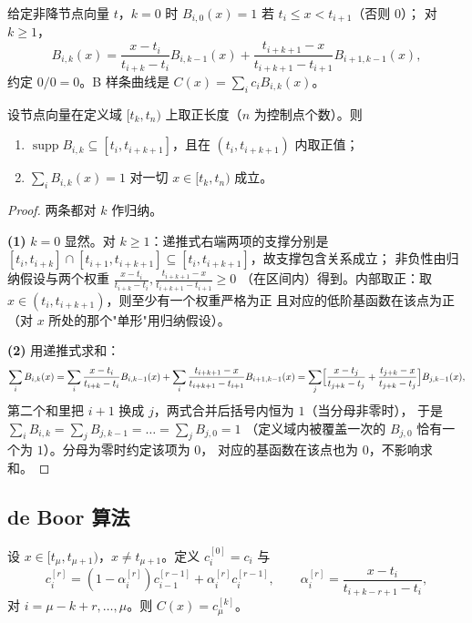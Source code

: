 \begin{definition}
给定非降节点向量 $t$，$k=0$ 时 $B_{i,0}(x)=1$ 若 $t_i\le x<t_{i+1}$（否则 $0$）；
对 $k\ge1$，
\[
B_{i,k}(x)=\frac{x-t_i}{t_{i+k}-t_i}B_{i,k-1}(x)+\frac{t_{i+k+1}-x}{t_{i+k+1}-t_{i+1}}B_{i+1,k-1}(x),
\]
约定 $0/0=0$。B 样条曲线是 $C(x)=\sum_i c_iB_{i,k}(x)$。
\end{definition}

\begin{theorem}[支撑、非负与单位分解]
\label{thm:partition}
设节点向量在定义域 $[t_k,t_{n})$ 上取正长度（$n$ 为控制点个数）。则
\begin{enumerate}
  \item $\operatorname{supp}B_{i,k}\subseteq[t_i,t_{i+k+1}]$，且在 $(t_i,t_{i+k+1})$ 内取正值；
  \item $\sum_{i}B_{i,k}(x)=1$ 对一切 $x\in[t_k,t_{n})$ 成立。
\end{enumerate}
\end{theorem}

\begin{proof}
两条都对 $k$ 作归纳。

\textbf{(1)} $k=0$ 显然。对 $k\ge1$：递推式右端两项的支撑分别是
$[t_i,t_{i+k}]\cap[t_{i+1},t_{i+k+1}]\subseteq[t_i,t_{i+k+1}]$，故支撑包含关系成立；
非负性由归纳假设与两个权重 $\frac{x-t_i}{t_{i+k}-t_i},\frac{t_{i+k+1}-x}{t_{i+k+1}-t_{i+1}}\ge0$
（在区间内）得到。内部取正：取 $x\in(t_i,t_{i+k+1})$，则至少有一个权重严格为正
且对应的低阶基函数在该点为正（对 $x$ 所处的那个"单形"用归纳假设）。

\textbf{(2)} 用递推式求和：
\[
\sum_i B_{i,k}(x)=\sum_i \frac{x-t_i}{t_{i+k}-t_i}B_{i,k-1}(x)
+\sum_i \frac{t_{i+k+1}-x}{t_{i+k+1}-t_{i+1}}B_{i+1,k-1}(x)
=\sum_j \Bigl[\frac{x-t_j}{t_{j+k}-t_j}+\frac{t_{j+k}-x}{t_{j+k}-t_j}\Bigr]B_{j,k-1}(x),
\]
第二个和里把 $i+1$ 换成 $j$，两式合并后括号内恒为 $1$（当分母非零时），
于是 $\sum_iB_{i,k}=\sum_jB_{j,k-1}=\dots=\sum_jB_{j,0}=1$
（定义域内被覆盖一次的 $B_{j,0}$ 恰有一个为 $1$）。分母为零时约定该项为 $0$，
对应的基函数在该点也为 $0$，不影响求和。
\end{proof}

\subsection{de Boor 算法}

\begin{theorem}
\label{thm:deboor}
设 $x\in[t_\mu,t_{\mu+1})$，$x\ne t_{\mu+1}$。定义 $c_i^{[0]}=c_i$ 与
\[
c_i^{[r]}=(1-\alpha_i^{[r]})c_{i-1}^{[r-1]}+\alpha_i^{[r]}c_i^{[r-1]},\qquad
\alpha_i^{[r]}=\frac{x-t_i}{t_{i+k-r+1}-t_i},
\]
对 $i=\mu-k+r,\dots,\mu$。则 $C(x)=c_\mu^{[k]}$。
\end{theorem}

